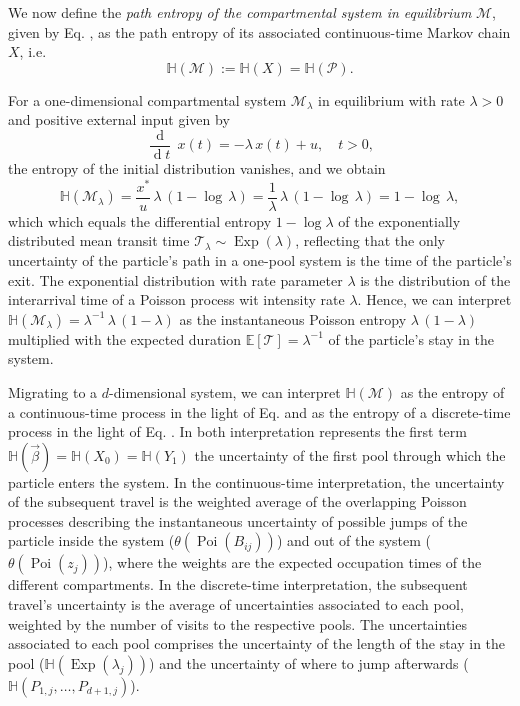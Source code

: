 \documentclass[smallextended]{svjour3}
\makeatletter
\renewcommand*{\eqref}[1]{%
  \hyperref[{#1}]{\textup{\tagform@{\ref*{#1}}}}%
}
\newcommand{\E}{\mathbb{E}}
\newcommand{\TT}{\mathcal{T}}
\renewcommand{\H}{\mathbb{H}}
\newcommand{\Exp}{\operatorname{Exp}}
\newcommand{\Poi}{\operatorname{Poi}}
\newcommand{\deriv}[1]{\frac{\operatorname{d}}{\operatorname{d}#1}}
\makeatother
\begin{document}
We now define the \emph{path entropy of the compartmental system in equilibrium} $\mathcal{M}$, given by Eq. \eqref{eqn:lin_CS_sys}, as the path entropy of its associated continuous-time Markov chain $X$, i.e.
\begin{equation*}
  \H(\mathcal{M}):=\H(X)=\H(\mathcal{P}).
\end{equation*}

For a one-dimensional compartmental system $\mathcal{M}_\lambda$ in equilibrium with rate $\lambda>0$ and positive external input given by
\begin{equation}
  \deriv{t}\,x(t) = -\lambda\,x(t) + u,\quad t>0,
\end{equation}
the entropy of the initial distribution vanishes, and we obtain
\begin{equation*}
  \H(\mathcal{M}_\lambda) = \frac{x^\ast}{u}\,\lambda\,(1-\log\,\lambda) = \frac{1}{\lambda}\,\lambda\,(1-\log\,\lambda) = 1-\log\,\lambda,
\end{equation*}  
which which equals the differential entropy $1-\log\lambda$ of the exponentially distributed mean transit time $\TT_\lambda\sim\Exp(\lambda)$, reflecting that the only uncertainty of the particle's path in a one-pool system is the time of the particle's exit.
The exponential distribution with rate parameter $\lambda$ is the distribution of the interarrival time of a Poisson process wit intensity rate $\lambda$.
Hence, we can interpret $\H(\mathcal{M}_\lambda) = \lambda^{-1}\,\lambda\,(1-\lambda)$ as the instantaneous Poisson entropy $\lambda\,(1-\lambda)$ multiplied with the expected duration $\E\left[\TT\right]=\lambda^{-1}$ of the particle's stay in the system.

Migrating to a $d$-dimensional system, we can interpret $\H(\mathcal{M})$ as the entropy of a continuous-time process in the light of Eq. \eqref{eqn:H_occupation_time} and as the entropy of a discrete-time process in the light of Eq. \eqref{eqn:H_number_of_visits}.
In both interpretation represents the first term $\H(\vec{\beta})=\H(X_0)=\H(Y_1)$ the uncertainty of the first pool through which the particle enters the system.
In the continuous-time interpretation, the uncertainty of the subsequent travel is the weighted average of the overlapping Poisson processes describing the instantaneous uncertainty of possible jumps of the particle inside the system ($\theta(\Poi(B_{ij}))$) and out of the system ($\theta(\Poi(z_j))$), where the weights are the expected occupation times of the different compartments. 
In the discrete-time interpretation, the subsequent travel's uncertainty is the average of uncertainties associated to each pool, weighted by the number of visits to the respective pools.
The uncertainties associated to each pool comprises the uncertainty of the length of the stay in the pool ($\H(\Exp(\lambda_j))$) and the uncertainty of where to jump afterwards ($\H(P_{1,j},\ldots,P_{d+1,j})$).
\end{document}
